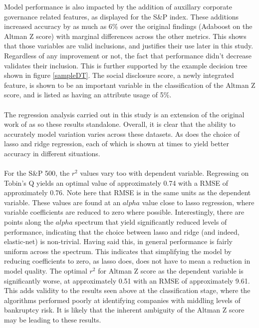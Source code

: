 Model performance is also impacted by the addition of auxillary corporate governance related features, as displayed for the S\&P index. These additions increased accuracy by as much as 6\% over the original findings (Adaboost on the Altman Z score) with marginal differences across the other metrics. This shows that those variables are valid inclusions, and justifies their use later in this study. Regardless of any improvement or not, the fact that performance didn't decrease validates their inclusion. This is further supported by the example decision tree shown in figure \ref{sampleDT}. The social disclosure score, a newly integrated feature, is shown to be an important variable in the classification of the Altman Z score, and is listed as having an attribute usage of 5\%. \\\\
The regression analysis carried out in this study is an extension of the original work of \cite{moldovan2015learning} as so these results standalone. Overall, it is clear that the ability to accurately model variation varies across these datasets. As does the choice of lasso and ridge regression, each of which is shown at times to yield better accuracy in different situations. 
\\\\
For the S\&P 500, the $r^2$ values vary too with dependent variable. Regressing on Tobin's Q yields an optimal value of approximately 0.74 with a RMSE of approximately 0.76. Note here that RMSE is in the same units as the dependent variable. These values are found at an $alpha$ value close to lasso regression, where variable coefficients are reduced to zero where possible. Interestingly, there are points along the $alpha$ spectrum that yield significantly reduced levels of performance, indicating that the choice between lasso and ridge (and indeed, elastic-net) is non-trivial. Having said this, in general performance is fairly uniform across the spectrum. This indicates that simplifying the model by reducing coefficients to zero, as lasso does, does not have to mean a reduction in model quality. The optimal $r^2$ for Altman Z score as the dependent variable is significantly worse, at approximately 0.51 with an RMSE of approximately 9.61. This adds validity to the results seen above at the classification stage, where the algorithms performed poorly at identifying companies with middling levels of bankruptcy risk. It is likely that the inherent ambiguity of the Altman Z score may be leading to these results. \\\\

